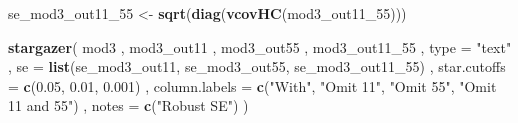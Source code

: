 \documentclass[]{article}
\newenvironment{Shaded}{\begin{snugshade}}{\end{snugshade}}
\newcommand{\DataTypeTok}[1]{\textcolor[rgb]{0.13,0.29,0.53}{#1}}
\newcommand{\DecValTok}[1]{\textcolor[rgb]{0.00,0.00,0.81}{#1}}
\newcommand{\FloatTok}[1]{\textcolor[rgb]{0.00,0.00,0.81}{#1}}
\newcommand{\KeywordTok}[1]{\textcolor[rgb]{0.13,0.29,0.53}{\textbf{#1}}}
\newcommand{\NormalTok}[1]{#1}
\newcommand{\StringTok}[1]{\textcolor[rgb]{0.31,0.60,0.02}{#1}}
\begin{document}
\begin{Shaded}
\begin{Highlighting}[]
\NormalTok{se_mod3_out11_}\DecValTok{55}\NormalTok{ <-}\StringTok{ }\KeywordTok{sqrt}\NormalTok{(}\KeywordTok{diag}\NormalTok{(}\KeywordTok{vcovHC}\NormalTok{(mod3_out11_}\DecValTok{55}\NormalTok{)))}

\KeywordTok{stargazer}\NormalTok{(}
\NormalTok{    mod3}
\NormalTok{  , mod3_out11}
\NormalTok{  , mod3_out55}
\NormalTok{  , mod3_out11_}\DecValTok{55}
\NormalTok{  , }\DataTypeTok{type =} \StringTok{"text"}
\NormalTok{  , }\DataTypeTok{se =} \KeywordTok{list}\NormalTok{(se_mod3_out11, se_mod3_out55, se_mod3_out11_}\DecValTok{55}\NormalTok{)}
\NormalTok{  , }\DataTypeTok{star.cutoffs =} \KeywordTok{c}\NormalTok{(}\FloatTok{0.05}\NormalTok{, }\FloatTok{0.01}\NormalTok{, }\FloatTok{0.001}\NormalTok{)}
\NormalTok{  , }\DataTypeTok{column.labels =} \KeywordTok{c}\NormalTok{(}\StringTok{"With"}\NormalTok{, }\StringTok{"Omit 11"}\NormalTok{, }\StringTok{"Omit 55"}\NormalTok{, }\StringTok{"Omit 11 and 55"}\NormalTok{) }
\NormalTok{  , }\DataTypeTok{notes =} \KeywordTok{c}\NormalTok{(}\StringTok{"Robust SE"}\NormalTok{)}
\NormalTok{)}
\end{Highlighting}
\end{Shaded}
\end{document}
